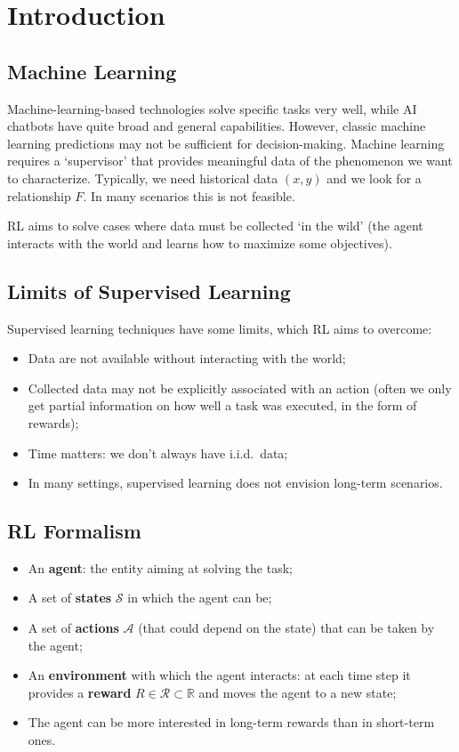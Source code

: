 \chapter{Introduction}
\section{Machine Learning}
Machine-learning-based technologies solve specific tasks very well, while AI chatbots have quite broad and general capabilities.
However, classic machine learning predictions may not be sufficient for decision-making. 
Machine learning requires a `supervisor' that provides meaningful data of the phenomenon we want to characterize. Typically, we need historical data $(x, y)$ and we look for a relationship $F$.
In many scenarios this is not feasible. 

RL aims to solve cases where data must be collected `in the wild' (the agent interacts with the world and learns how to maximize some objectives).

\section{Limits of Supervised Learning}
Supervised learning techniques have some limits, which RL aims to overcome:
\begin{itemize}
    \item Data are not available without interacting with the world;
    \item Collected data may not be explicitly associated with an action (often we only get partial information on how well a task was executed, in the form of rewards);
    \item Time matters: we don't always have i.i.d.\ data;
    \item In many settings, supervised learning does not envision long-term scenarios.
\end{itemize}

\section{RL Formalism}
\begin{itemize}
    \item An \textbf{agent}: the entity aiming at solving the task;
    \item A set of \textbf{states} $\mathcal{S}$ in which the agent can be;
    \item A set of \textbf{actions} $\mathcal{A}$ (that could depend on the state) that can be taken by the agent;
    \item An \textbf{environment} with which the agent interacts: at each time step it provides a \textbf{reward} $R\in\mathcal{R}\subset\mathbb{R}$ and moves the agent to a new state;
    \item The agent can be more interested in long-term rewards than in short-term ones.
\end{itemize}


